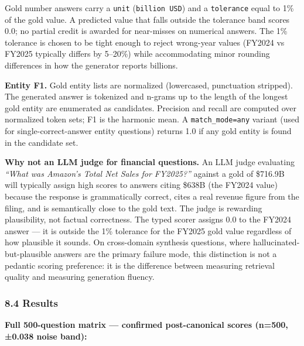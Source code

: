 \documentclass[
]{article}
\begin{document}
Gold number answers carry a \texttt{unit} (\texttt{billion\ USD}) and a
\texttt{tolerance} equal to 1\% of the gold value. A predicted value
that falls outside the tolerance band scores 0.0; no partial credit is
awarded for near-misses on numerical answers. The 1\% tolerance is
chosen to be tight enough to reject wrong-year values (FY2024 vs FY2025
typically differs by 5--20\%) while accommodating minor rounding
differences in how the generator reports billions.

\textbf{Entity F1.} Gold entity lists are normalized (lowercased,
punctuation stripped). The generated answer is tokenized and n-grams up
to the length of the longest gold entity are enumerated as candidates.
Precision and recall are computed over normalized token sets; F1 is the
harmonic mean. A \texttt{match\_mode=any} variant (used for
single-correct-answer entity questions) returns 1.0 if any gold entity
is found in the candidate set.

\textbf{Why not an LLM judge for financial questions.} An LLM judge
evaluating \emph{``What was Amazon's Total Net Sales for FY2025?''}
against a gold of \$716.9B will typically assign high scores to answers
citing \$638B (the FY2024 value) because the response is grammatically
correct, cites a real revenue figure from the filing, and is
semantically close to the gold text. The judge is rewarding
plausibility, not factual correctness. The typed scorer assigns 0.0 to
the FY2024 answer --- it is outside the 1\% tolerance for the FY2025
gold value regardless of how plausible it sounds. On cross-domain
synthesis questions, where hallucinated-but-plausible answers are the
primary failure mode, this distinction is not a pedantic scoring
preference: it is the difference between measuring retrieval quality and
measuring generation fluency.

\subsubsection{8.4 Results}\label{results-1}

\textbf{Full 500-question matrix --- confirmed post-canonical scores
(n=500, ±0.038 noise band):}
\end{document}
